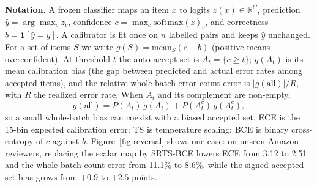\documentclass[sigconf,anonymous,review]{acmart}
\begin{document}
\textbf{Notation.} A frozen classifier maps an item $x$ to logits
$z(x)\in\mathbb R^C$, prediction $\hat y=\arg\max_c z_c$, confidence
$c=\max_c\mathrm{softmax}(z)_c$, and correctness $b=\mathbf 1[\hat y=y]$.
A calibrator is fit once on $n$ labelled pairs and keeps $\hat y$
unchanged. For a set of items $S$ we write $g(S)=\mathrm{mean}_S(c-b)$
(positive means overconfident). At threshold $t$ the auto-accept set is
$A_t=\{c\ge t\}$; $g(A_t)$ is its mean calibration bias (the gap between
predicted and actual error rates among accepted items), and the relative
whole-batch error-count error is $|g(\text{all})|/R$, with $R$ the realized
error rate. When $A_t$ and its complement are non-empty,
\begin{equation}
g(\text{all})=P(A_t)\,g(A_t)+P(A_t^c)\,g(A_t^c),
\label{eq:decomp}
\end{equation}
so a small whole-batch bias can coexist with a biased accepted set. ECE is
the 15-bin expected calibration error; TS is temperature scaling; BCE is
binary cross-entropy of $c$ against $b$. Figure~\ref{fig:reversal} shows one case: on unseen Amazon
reviewers, replacing the scalar map by SRTS-BCE lowers ECE from 3.12 to
2.51 and the whole-batch count error from 11.1\% to 8.6\%, while the
signed accepted-set bias grows from $+0.9$ to $+2.5$ points.
\end{document}
